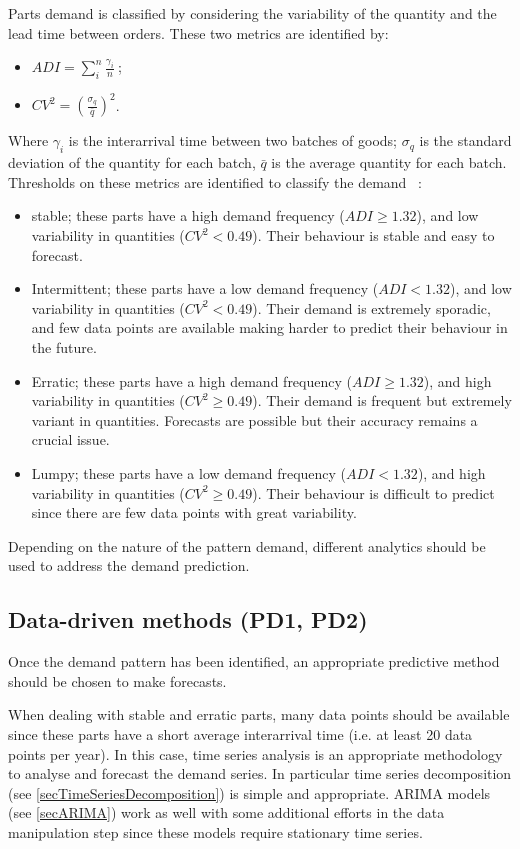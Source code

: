 Parts demand is classified by considering the variability of the quantity and the lead time between orders. These two metrics are identified by:
\begin{itemize}
    \item $ADI=\sum_{i}^{n}\frac{\gamma_i}{n}\ $;
    \item $CV^2=\left(\frac{\sigma_q}{\bar{q}}\right)^2$.
\end{itemize}

Where $\gamma_i$ is the interarrival time between two batches of goods; $\sigma_q$ is the standard deviation of the quantity for each batch, $\bar{q}$ is the average quantity for each batch. Thresholds on these metrics are identified to classify the demand ~\cite{Syntetos2005}:

\begin{itemize}
    \item stable; these parts have a high demand frequency ($ADI\geq1.32$), and low variability in quantities ($CV^2<0.49$). Their behaviour is stable and easy to forecast.
	\item Intermittent; these parts have a low demand frequency ($ADI<1.32$), and low variability in quantities ($CV^2<0.49$). Their demand is extremely sporadic, and few data points are available making harder to predict their behaviour in the future.
	\item Erratic; these parts have a high demand frequency ($ADI\geq1.32$), and high variability in quantities ($CV^2\geq0.49$). Their demand is frequent but extremely variant in quantities. Forecasts are possible but their accuracy remains a crucial issue.
	\item Lumpy; these parts have a low demand frequency ($ADI<1.32$), and high variability in quantities ($CV^2\geq0.49$). Their behaviour is difficult to predict since there are few data points with great variability. 
\end{itemize}

Depending on the nature of the pattern demand, different analytics should be used to address the demand prediction. 

\subsection{Data-driven methods (PD1, PD2)}
Once the demand pattern has been identified, an appropriate predictive method should be chosen to make forecasts.\par

When dealing with stable and erratic parts, many data points should be available since these parts have a short average interarrival time (i.e. at least 20 data points per year). In this case, time series analysis is an appropriate methodology to analyse and forecast the demand series. In particular time series decomposition (see \ref{secTimeSeriesDecomposition}) is simple and appropriate. ARIMA models (see \ref{secARIMA}) work as well with some additional efforts in the data manipulation step since these models require stationary time series.\par

